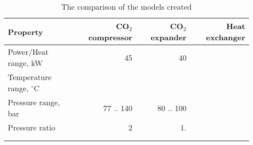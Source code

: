 \begin{table}
\label{tab:DiscussionComparison}
\caption{The comparison of the models created}
\begin{center}
\begin{tabulary}{0.9\textwidth}{LRRR}
\toprule
Property    	                &	CO$_2$ compressor   & CO$_2$	expander    & Heat exchanger    \\
\midrule
Power/Heat range, kW            &       45              &       40              &                   \\
Temperature range, $^\circ$C    &                       &                       &                   \\
Pressure range, bar             &   77 .. 140           &     80 .. 100         &                   \\
Pressure ratio                  &   2                   &        1.             &                   \\
& & & \\
& & & \\
\bottomrule
\end{tabulary}
\end{center}
\end{table}